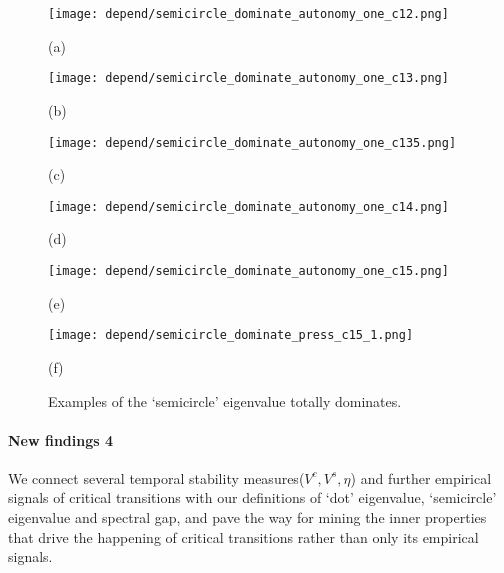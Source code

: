 \documentclass[a4paper,fleqn,12pt]{article}
\begin{document}
\begin{figure}[htbp]
\begin{minipage}{0.4\linewidth}
  \texttt{[image: depend/semicircle\_dominate\_autonomy\_one\_c12.png]}
  {\centering(a) \par}
\end{minipage}
\hfill
\begin{minipage}{0.4\linewidth}
  \texttt{[image: depend/semicircle\_dominate\_autonomy\_one\_c13.png]}
  {\centering(b) \par}
\end{minipage}
\vfill
\begin{minipage}{0.4\linewidth}
  \texttt{[image: depend/semicircle\_dominate\_autonomy\_one\_c135.png]}
  {\centering(c) \par}
\end{minipage}
\hfill
\begin{minipage}{0.4\linewidth}
  \texttt{[image: depend/semicircle\_dominate\_autonomy\_one\_c14.png]}
  {\centering(d) \par}
\end{minipage}
\vfill
\begin{minipage}{0.4\linewidth}
  \texttt{[image: depend/semicircle\_dominate\_autonomy\_one\_c15.png]}
  {\centering(e) \par}
\end{minipage}
\hfill
\begin{minipage}{0.4\linewidth}
  \texttt{[image: depend/semicircle\_dominate\_press\_c15\_1.png]}
  {\centering(f) \par}
\end{minipage}
\caption{Examples of the `semicircle' eigenvalue totally dominates.}
\label{fig:nonstructural-semicircle-dominate}
\end{figure}

\paragraph*{New findings 4}
We connect several temporal stability measures($V^c, V^s, \eta$) 
and further empirical signals of critical transitions with our definitions of `dot' eigenvalue, `semicircle' eigenvalue and spectral gap,
and pave the way for mining the inner properties that drive the happening of critical transitions rather than only its empirical signals.
\end{document}
